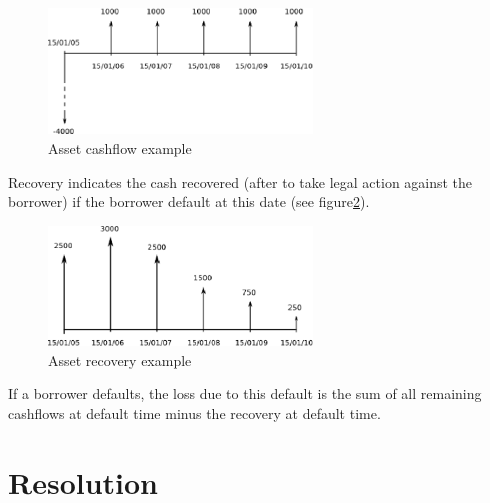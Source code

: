 \documentclass[a4paper,12pt,final]{article}
\begin{document}
\begin{figure}[!hb]
\begin{center}
\includegraphics[width=7cm, angle=0]{./images/cashflow.eps}
\caption{Asset cashflow example}
\label{cashflow}
\end{center}
\end{figure}

Recovery indicates the cash recovered (after to take legal action against the 
borrower) if the borrower default at this date (see figure\ref{recovery}).
\newline

\begin{figure}[!hb]
\begin{center}
\includegraphics[width=7cm, angle=0]{./images/recovery.eps}
\caption{Asset recovery example}
\label{recovery}
\end{center}
\end{figure}

If a borrower defaults, the loss due to this default is the sum of all remaining
cashflows at default time minus the recovery at default time.


\section{Resolution}
\end{document}
